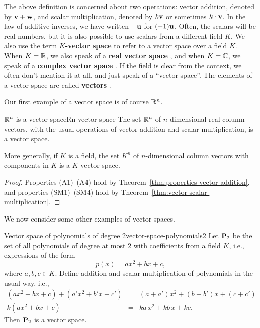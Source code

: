 The above definition is concerned about two operations: vector
addition, denoted by $\vect{v} + \vect{w}$, and scalar multiplication,
denoted by $k\vect{v}$ or sometimes $k\cdot\vect{v}$. In the law of
additive inverses, we have written $-\vect{u}$ for $(-1)\vect{u}$.
Often, the scalars will be real numbers, but it is also possible to
use scalars from a different field $K$. We also use the term
\textbf{$K$-vector space}%
 to refer to a vector space
over a field $K$.  When $K=\mathbb{R}$, we also speak of a \textbf{real vector
  space}%
%
, and when $K=\mathbb{C}$, we speak of a
\textbf{complex vector space}%
%
. If the field is clear from the context,
we often don't mention it at all, and just speak of a ``vector
space''. The elements of a vector space are called \textbf{vectors}%
.

Our first example of a vector space is of course $\mathbb{R}^n$.

\begin{example}{$\mathbb{R}^n$ is a vector space}{Rn-vector-space}
  The set $\mathbb{R}^n$ of $n$-dimensional real column vectors, with the
  usual operations of vector addition and scalar multiplication, is a
  vector space.

  More generally, if $K$ is a field, the set $K^n$ of $n$-dimensional
  column vectors with components in $K$ is a $K$-vector space.
\end{example}

\begin{proof}
  Properties (A1)--(A4) hold by
  Theorem~\ref{thm:properties-vector-addition}, and properties
  (SM1)--(SM4) hold by Theorem~\ref{thm:vector-scalar-multiplication}.
\end{proof}

We now consider some other examples of vector spaces.

\begin{example}{Vector space of polynomials of degree 2}{vector-space-polynomials2}
  Let $\mathbf{P}_2$%
   be the set of all polynomials%
   of degree at most $2$ with coefficients from a
  field $K$, i.e., expressions of the form
  \begin{equation*}
    p(x) = ax^2 + bx + c,
  \end{equation*}
  where $a,b,c\in K$. Define addition%
   and scalar multiplication%
   of polynomials in the
  usual way, i.e.,
  \begin{eqnarray*}
    (ax^2 + bx + c) + (a'x^2 + b'x + c') &=& (a + a')x^2 + (b + b')x + (c + c') \\
    k(ax^2 + bx + c) &=& ka\,x^2 + kb\,x + kc.
  \end{eqnarray*}
  Then $\mathbf{P}_2$ is a vector space.
\end{example}

